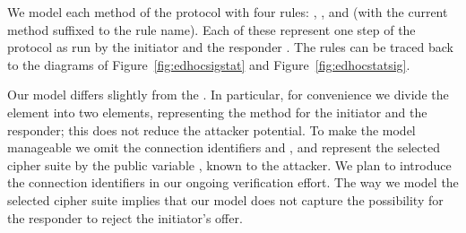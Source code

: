 We model each method of the protocol with four rules: , , 
and  (with the current method suffixed to the rule name).
%
Each of these represent one step of the protocol as run by the initiator 
and the responder .
%
The rules can be traced back to the diagrams of
Figure~\ref{fig:edhocsigstat} and Figure~\ref{fig:edhocstatsig}.
%

Our model differs slightly from the \mSpec{}.
%
In particular, for convenience we divide the \mMethod{} element into two
elements, representing the method for the initiator and the responder; this
does not reduce the attacker potential.
%
To make the model manageable we omit the connection identifiers \mCi{} and
\mCr{}, and represent the selected cipher suite by the public variable
, known to the attacker.
%
We plan to introduce the connection identifiers in our ongoing verification
effort.
%
The way we model the selected cipher suite implies that our model does not
capture the possibility for the responder to reject the initiator's offer. 
%

